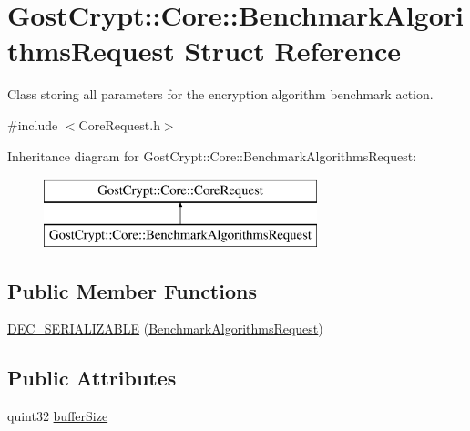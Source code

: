 \hypertarget{struct_gost_crypt_1_1_core_1_1_benchmark_algorithms_request}{}\section{Gost\+Crypt\+:\+:Core\+:\+:Benchmark\+Algorithms\+Request Struct Reference}
\label{struct_gost_crypt_1_1_core_1_1_benchmark_algorithms_request}


Class storing all parameters for the encryption algorithm benchmark action.  




{\ttfamily \#include $<$Core\+Request.\+h$>$}

Inheritance diagram for Gost\+Crypt\+:\+:Core\+:\+:Benchmark\+Algorithms\+Request\+:\begin{figure}[H]
\begin{center}
\leavevmode
\includegraphics[height=2.000000cm]{struct_gost_crypt_1_1_core_1_1_benchmark_algorithms_request}
\end{center}
\end{figure}
\subsection*{Public Member Functions}
\begin{DoxyCompactItemize}
\item 
\hyperlink{struct_gost_crypt_1_1_core_1_1_benchmark_algorithms_request_a924befed713288963e6221b25e5188c7}{D\+E\+C\+\_\+\+S\+E\+R\+I\+A\+L\+I\+Z\+A\+B\+LE} (\hyperlink{struct_gost_crypt_1_1_core_1_1_benchmark_algorithms_request}{Benchmark\+Algorithms\+Request})
\end{DoxyCompactItemize}
\subsection*{Public Attributes}
\begin{DoxyCompactItemize}
\item 
quint32 \hyperlink{struct_gost_crypt_1_1_core_1_1_benchmark_algorithms_request_a7bb9167ef18e2c9186ddcc4edd665484}{buffer\+Size}
\end{DoxyCompactItemize}


